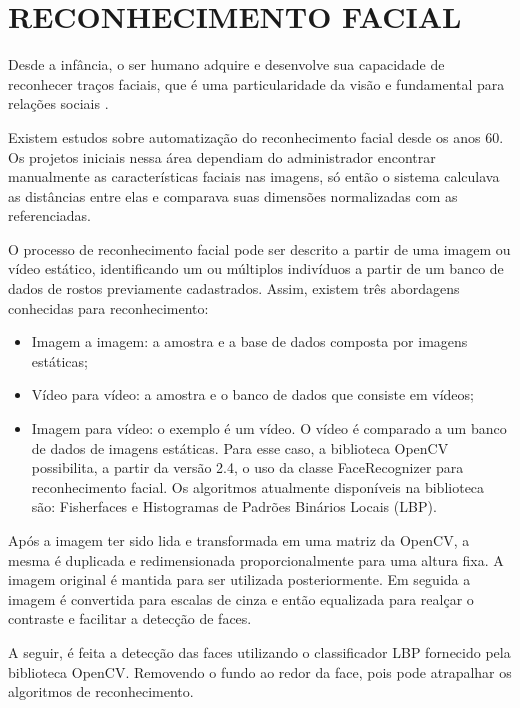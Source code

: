 \section{RECONHECIMENTO FACIAL}\label{sec:formatacaoTexto2}

Desde a infância, o ser humano adquire e desenvolve sua capacidade de reconhecer traços faciais, 
que é uma particularidade da visão e fundamental para relações sociais \cite{rouhani2019}.

Existem estudos sobre automatização do reconhecimento facial desde os anos 60. Os projetos iniciais nessa 
área dependiam do administrador encontrar manualmente as características faciais nas imagens, só 
então o sistema calculava as distâncias entre elas e comparava suas dimensões normalizadas com 
as referenciadas.

O processo de reconhecimento facial pode ser descrito a partir de uma imagem ou vídeo estático, 
identificando um ou múltiplos indivíduos a partir de um banco de dados de rostos previamente 
cadastrados. Assim, existem três abordagens conhecidas para reconhecimento:

\begin{itemize}
    \item Imagem a imagem: a amostra e a base de dados composta por imagens estáticas;

    \item Vídeo para vídeo: a amostra e o banco de dados que consiste em vídeos;

    \item Imagem para vídeo: o exemplo é um vídeo. O vídeo é comparado a um banco de 
    dados de imagens estáticas. Para esse caso, a biblioteca OpenCV possibilita,
     a partir da versão 2.4, o uso da classe FaceRecognizer para reconhecimento 
     facial. Os algoritmos atualmente disponíveis na biblioteca são: Fisherfaces 
     e Histogramas de Padrões Binários Locais (LBP).
\end{itemize}

Após a imagem ter sido lida e transformada em uma matriz da OpenCV, a mesma é
duplicada e redimensionada proporcionalmente para uma altura fixa. A imagem original 
é mantida para ser utilizada posteriormente. Em seguida a imagem é convertida para 
escalas de cinza e então equalizada para realçar o contraste e facilitar a detecção de faces.

A seguir, é feita a detecção das faces utilizando o classificador LBP
fornecido pela biblioteca OpenCV. Removendo o fundo ao redor da face, pois 
pode atrapalhar os algoritmos de reconhecimento.

